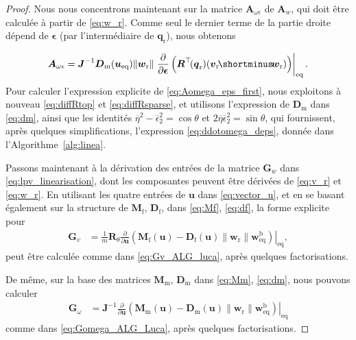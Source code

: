 \begin{proof}
Nous nous concentrons maintenant sur la matrice $\boldsymbol{A}_{\omega \epsilon}$ de $\boldsymbol{A}_{w}$, qui doit être calculée à partir de \eqref{eq:w_r}. Comme seul le dernier terme de la partie droite dépend de $\boldsymbol{\epsilon}$ (par l'intermédiaire de $\boldsymbol{q}_{\mathrm r}$), nous obtenons

\begin{align}
\label{eq:Aomega_eps_first}
\boldsymbol{A}_{ \omega \epsilon} =  \boldsymbol{J}^{-1}
\boldsymbol{D}_{\mathrm{m}} (\boldsymbol{u}_{\text{eq}}) \lVert  \boldsymbol{w}_{\mathrm{r}} \rVert 
\left. 
\frac{\partial }{\partial \boldsymbol{\epsilon}} \left( \boldsymbol{R}^\top \!(\boldsymbol{q}_{\mathrm{r}}) (\boldsymbol{v}_{\mathrm{r}} \! \shortminus \! \boldsymbol{w}_{\text{r}}) \right) \right|_{\mathrm{eq}}.
\end{align}
Pour calculer l'expression explicite de \eqref{eq:Aomega_eps_first}, nous exploitons à nouveau \eqref{eq:diffRtop} et \eqref{eq:diffRsparse}, et utilisons l'expression de $\boldsymbol{D}_{\mathrm{m}}$ dans \eqref{eq:dm}, ainsi que les identités $\overline \eta^2 - \overline \epsilon_2^2 = \cos \theta$ et $2\overline \eta \overline \epsilon_2^2 = \sin \theta$, qui fournissent, après quelques simplifications, l'expression \eqref{eq:ddotomega_deps}, donnée dans l'Algorithme~\ref{alg:linea}.

Passons maintenant à la dérivation des entrées de la matrice $\boldsymbol{G}_{w}$ dans \eqref{eq:lpv_linearisation}, dont les composantes peuvent être dérivées de \eqref{eq:v_r} et \eqref{eq:w_r}. En utilisant les quatre entrées de $\boldsymbol{u}$ dans \eqref{eq:vector_u}, et en se basant également sur la structure de $\boldsymbol{M}_{\text{f}}$,
$\boldsymbol{D}_{\text{f}}$, dans \eqref{eq:Mf}, \eqref{eq:df}, la forme explicite pour
\begin{align}
    \boldsymbol{G}_{v} \! &= \! 
    \frac{1}{m} \boldsymbol{R}_\theta \! \left.\frac{\partial}{\partial \boldsymbol{u}} \! 
     \left( \boldsymbol{M}_{\text{f}}(\boldsymbol{u}) \! - \! \boldsymbol{D}_{\text{f}}(\boldsymbol{u}) \lVert \boldsymbol{w}_{\text{r}} \rVert \boldsymbol{w}^{\text{b}}_{\mathrm{eq}}   \right)\right|_{\mathrm{eq}} ,
\end{align}
peut être calculée comme dans \eqref{eq:Gv_ALG_luca}, après quelques factorisations. 

De même, sur la base des matrices $\boldsymbol{M}_{\text{m}}$, $\boldsymbol{D}_{\text{m}}$ dans \eqref{eq:Mm}, \eqref{eq:dm}, 
nous pouvons calculer
\begin{align}
     \boldsymbol{G}_{\omega} \! &= \!  \boldsymbol{J}^{-1} \! \left.\frac{\partial}{\partial \boldsymbol{u}} \! 
     \left( \boldsymbol{M}_{\text{m}}(\boldsymbol{u}) \! - \! \boldsymbol{D}_{\text{m}}(\boldsymbol{u}) \lVert \boldsymbol{w}_{\text{r}} \rVert \boldsymbol{w}^{\text{b}}_{\mathrm{eq}}   \right)\right|_{\mathrm{eq}}
\end{align}
comme dans \eqref{eq:Gomega_ALG_Luca}, après quelques factorisations. 



\end{proof}

